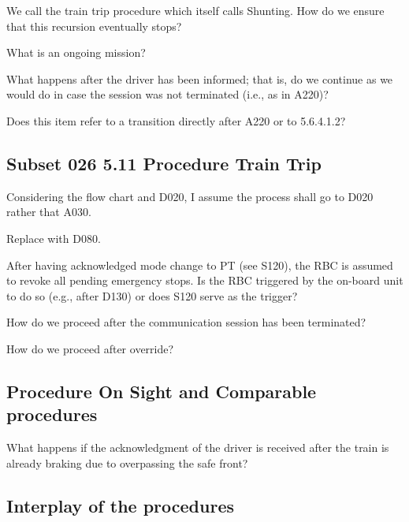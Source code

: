 \documentclass{template/openetcs_article}
\begin{document}
We call the train trip procedure which itself calls Shunting. How do we ensure that this recursion eventually stops?

What is an ongoing mission?

What happens after the driver has been informed; that is, do we continue as we would do in case the session was not terminated (i.e., as in A220)?

Does this item refer to a transition directly after A220 or to 5.6.4.1.2?





\subsection{Subset 026 5.11 Procedure Train Trip}

Considering the flow chart and D020, I assume the process shall go to D020 rather that A030.

Replace with D080.

After having acknowledged mode change to PT (see S120), the RBC is assumed to revoke all pending emergency stops. Is the RBC triggered by the on-board unit to do so (e.g., after D130) or does S120 serve as the trigger?

How do we proceed after the communication session has been terminated?

How do we proceed after override?

\subsection{Procedure On Sight and Comparable procedures}

What happens if the acknowledgment of the driver is received after the train is already braking due to overpassing the safe front?

\subsection{Interplay of the procedures}
\end{document}
